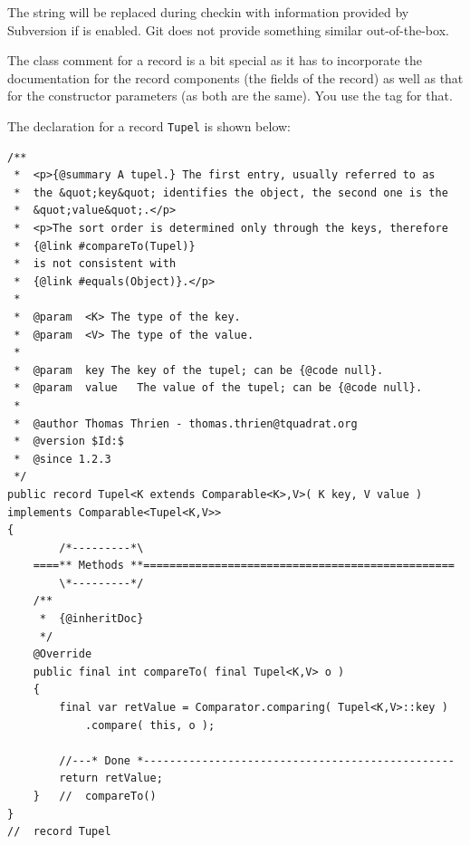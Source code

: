 The string  will be replaced during checkin with information provided by Subversion \autocite{APACHE_SUBVERSION} if  is enabled. Git \autocite{Git} does not provide something similar out-of-the-box.

The class comment for a record is a bit special as it has to incorporate the documentation for the record components (the fields of the record) as well as that for the constructor parameters (as both are the same). You use the  tag for that.

The declaration for a record \lstinline|Tupel| is shown below:

\begin{lstlisting}[caption={A tupel class}]
/**
 *  <p>{@summary A tupel.} The first entry, usually referred to as 
 *  the &quot;key&quot; identifies the object, the second one is the
 *  &quot;value&quot;.</p>
 *  <p>The sort order is determined only through the keys, therefore
 *  {@link #compareTo(Tupel)}
 *  is not consistent with
 *  {@link #equals(Object)}.</p>
 *
 *  @param  <K> The type of the key.
 *  @param  <V> The type of the value.
 *
 *  @param  key The key of the tupel; can be {@code null}.
 *  @param  value   The value of the tupel; can be {@code null}.
 *
 *  @author Thomas Thrien - thomas.thrien@tquadrat.org
 *  @version $Id:$
 *  @since 1.2.3
 */
public record Tupel<K extends Comparable<K>,V>( K key, V value ) implements Comparable<Tupel<K,V>>
{
        /*---------*\
    ====** Methods **================================================
        \*---------*/
    /**
     *  {@inheritDoc} 
     */
    @Override
    public final int compareTo( final Tupel<K,V> o )
    {
        final var retValue = Comparator.comparing( Tupel<K,V>::key )
            .compare( this, o ); 

        //---* Done *------------------------------------------------
        return retValue;
    }   //  compareTo()
}
//  record Tupel
\end{lstlisting}

